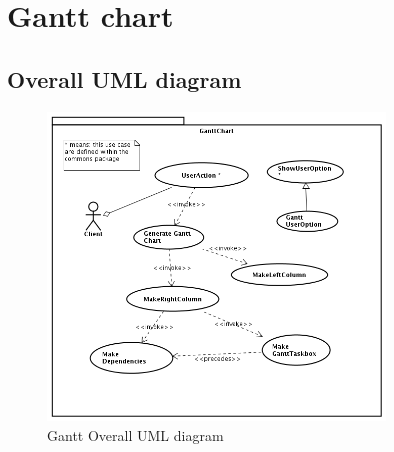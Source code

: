 












\chapter{Gantt chart}
\section*{Overall UML diagram}
\begin{figure}[h!] \centering
\includegraphics[width=0.8\textwidth]{../Milestone2-UseCases/Gantt/img/GanttChart.png}
\caption{Gantt Overall UML diagram}
\label{fig:ganttDiagram}
\end{figure}






